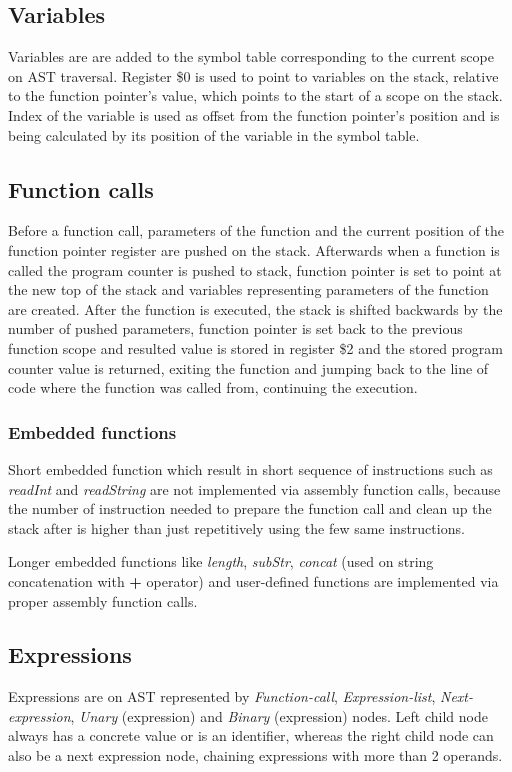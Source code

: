 \documentclass[12pt]{article}
\begin{document}
\subsection{Variables}
Variables are are added to the symbol table corresponding to the current scope on AST traversal.
Register \$0 is used to point to variables on the stack, relative to the function pointer's value, which points to the start of a scope on the stack. Index of the variable is used as offset from the function pointer's position and is being calculated by its position of the variable in the symbol table. 

\subsection{Function calls}
Before a function call, parameters of the function and the current position of the function pointer register are pushed on the stack. Afterwards when a function is called the program counter is pushed to stack, function pointer is set to point at the new top of the stack and variables representing parameters of the function are created. After the function is executed, the stack is shifted backwards by the number of pushed parameters, function pointer is set back to the previous function scope and resulted value is stored in register \$2 and the stored program counter value is returned, exiting the function and jumping back to the line of code where the function was called from, continuing the execution.

\subsubsection{Embedded functions}
Short embedded function which result in short sequence of instructions such as \emph{readInt} and \emph{readString} are not implemented via assembly function calls, because the number of instruction needed to prepare the function call and clean up the stack after is higher than just repetitively using the few same instructions.

Longer embedded functions like \emph{length}, \emph{subStr}, \emph{concat} (used on string concatenation with \textbf{+} operator) and user-defined functions are implemented via proper assembly function calls.

\subsection{Expressions}
Expressions are on AST represented by \emph{Function-call}, \emph{Expression-list}, \emph{Next-expression}, \emph{Unary} (expression) and \emph{Binary} (expression) nodes. Left child node always has a concrete value or is an identifier, whereas the right child node can also be a next expression node, chaining expressions with more than 2 operands.
\end{document}
